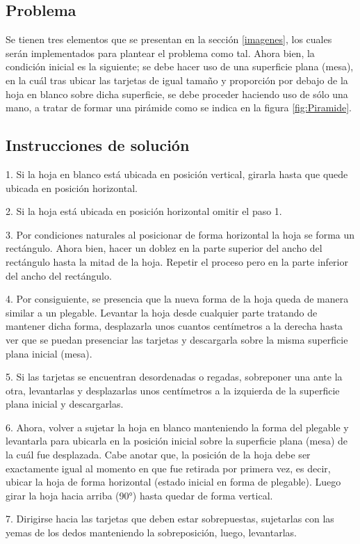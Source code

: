 \documentclass{article}
\begin{document}
\subsection{Problema}
Se tienen tres elementos que se presentan en la sección \ref{imagenes}, los cuales serán implementados para plantear el problema como tal.
Ahora bien, la condición inicial es la siguiente; se debe hacer uso de una superficie plana (mesa), en la cuál tras ubicar las tarjetas de igual tamaño y proporción por debajo de la hoja en blanco sobre dicha superficie, se debe proceder haciendo uso de sólo una mano, a tratar de formar una pirámide como se indica en la figura \ref{fig:Piramide}.

\subsection{Instrucciones de solución}
1. Si la hoja en blanco está ubicada en posición vertical, girarla hasta que quede ubicada en posición horizontal.

2. Si la hoja está ubicada en posición horizontal omitir el paso 1.

3. Por condiciones naturales al posicionar de forma horizontal la hoja se forma un rectángulo. Ahora bien, hacer un doblez en la parte superior del ancho del rectángulo hasta la mitad de la hoja. Repetir el proceso pero en la parte inferior del ancho del rectángulo. 

4. Por consiguiente, se presencia que la nueva forma de la hoja queda de manera similar a un plegable. Levantar la hoja desde cualquier parte tratando de mantener dicha forma, desplazarla unos cuantos centímetros a la derecha hasta ver que se puedan presenciar las tarjetas y descargarla sobre la misma superficie plana inicial (mesa).

5. Si las tarjetas se encuentran desordenadas o regadas, sobreponer una ante la otra, levantarlas y desplazarlas unos centímetros a la izquierda de la superficie plana inicial y descargarlas. 

6. Ahora, volver a sujetar la hoja en blanco manteniendo la forma del plegable y levantarla para ubicarla en la posición inicial sobre la superficie plana (mesa) de la cuál fue desplazada. Cabe anotar que, la posición de la hoja debe ser exactamente igual al momento en que fue retirada por primera vez, es decir, ubicar la hoja de forma horizontal (estado inicial en forma de plegable). Luego girar la hoja hacia arriba (90°) hasta quedar de forma vertical. 

7. Dirigirse hacia las tarjetas que deben estar sobrepuestas, sujetarlas con las yemas de los dedos manteniendo la sobreposición, luego, levantarlas.
\end{document}
